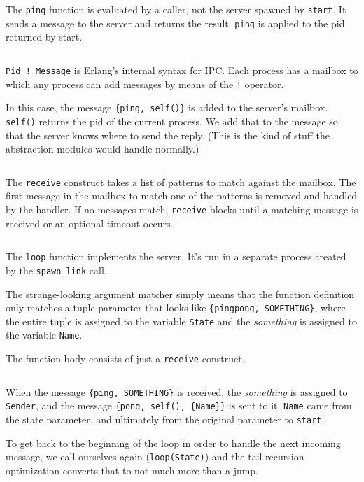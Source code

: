 \documentclass{beamer}
\begin{document}
\begin{frame}[fragile]
  \inputminted[firstline=9,lastline=9]{erlang}{pingpong-00.erl}

  The \verb|ping| function is evaluated by a caller, not the server spawned by
  \verb|start|. It sends a message to the server and returns the result.
  \verb|ping| is applied to the pid returned by start.

  \inputminted[firstline=10,lastline=10]{erlang}{pingpong-00.erl}

  \verb|Pid ! Message| is Erlang’s internal syntax for IPC. Each process has a
  mailbox to which any process can add messages by means of the \verb|!|
  operator.

  In this case, the message \verb|{ping, self()}| is added to the server’s
  mailbox. \verb|self()| returns the pid of the current process. We add that to
  the message so that the server knows where to send the reply. (This is the
  kind of stuff the abstraction modules would handle normally.)
\end{frame}

\begin{frame}[fragile]
  \inputminted[firstline=11,lastline=13]{erlang}{pingpong-00.erl}

  The \verb|receive| construct takes a list of patterns to match against the
  mailbox.  The first message in the mailbox to match one of the patterns is
  removed and handled by the handler. If no messages match, \verb|receive|
  blocks until a matching message is received or an optional timeout occurs.
\end{frame}

\begin{frame}[fragile]
  \inputminted[firstline=17,lastline=17]{erlang}{pingpong-00.erl}

  The \verb|loop| function implements the server. It’s run in a separate
  process created by the \verb|spawn_link| call.

  The strange-looking argument matcher simply means that the function
  definition only matches a tuple parameter that looks like
  \verb|{pingpong, SOMETHING}|, where the entire tuple is assigned to the
  variable \verb|State| and the \emph{something} is assigned to the variable
  \verb|Name|.
\end{frame}

\begin{frame}[fragile]
  The function body consists of just a \verb|receive| construct.

  \inputminted[firstline=18,lastline=21]{erlang}{pingpong-00.erl}

  When the message \verb|{ping, SOMETHING}| is received, the \emph{something}
  is assigned to \verb|Sender|, and the message \verb|{pong, self(), {Name}}|
  is sent to it. \verb|Name| came from the state parameter, and ultimately from
  the original parameter to \verb|start|.

  To get back to the beginning of the loop in order to handle the next incoming
  message, we call ourselves again (\verb|loop(State)|) and the tail recursion
  optimization converts that to not much more than a jump.
\end{frame}
\end{document}
